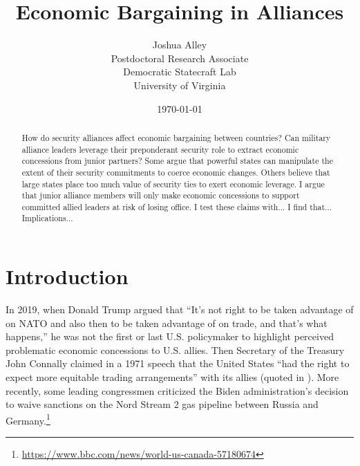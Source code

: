 \documentclass[12pt]{article}
\title{\textbf{Economic Bargaining in Alliances}}
\author{
Joshua Alley\\
Postdoctoral Research Associate\\
Democratic Statecraft Lab\\
University of Virginia 
}
\date{\today}
\begin{document}
\maketitle 

\begin{abstract}
How do security alliances affect economic bargaining between countries?
Can military alliance leaders leverage their preponderant security role to extract economic concessions from junior partners?
Some argue that powerful states can manipulate the extent of their security commitments to coerce economic changes. 
Others believe that large states place too much value of security ties to exert economic leverage.  
I argue that junior alliance members will only make economic concessions to support committed allied leaders at risk of losing office. 
I test these claims with...
I find that...
Implications...
\end{abstract} 


\newpage 
\doublespace 


\section{Introduction}

In 2019, when Donald Trump argued that ``It's not right to be taken advantage of on NATO and also then to be taken advantage of on trade, and that's what happens,'' he was not the first or last U.S. policymaker to highlight perceived problematic economic concessions to U.S. allies.
Then Secretary of the Treasury John Connally claimed in a 1971 speech that the United States ``had the right to expect more equitable trading arrangements'' with its allies (quoted in \citep[pg 175]{Sayle2019}).
More recently, some leading congressmen criticized the Biden administration's decision to waive sanctions on the Nord Stream 2 gas pipeline between Russia and Germany.\footnote{\url{https://www.bbc.com/news/world-us-canada-57180674}}
\end{document}
